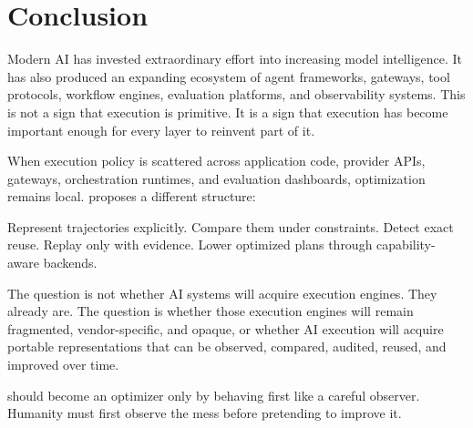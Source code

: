 \section{Conclusion}

Modern AI has invested extraordinary effort into increasing model intelligence. It has also produced an expanding ecosystem of agent frameworks, gateways, tool protocols, workflow engines, evaluation platforms, and observability systems. This is not a sign that execution is primitive. It is a sign that execution has become important enough for every layer to reinvent part of it.

When execution policy is scattered across application code, provider APIs, gateways, orchestration runtimes, and evaluation dashboards, optimization remains local. \migaki{} proposes a different structure:

\begin{center}
Represent trajectories explicitly. Compare them under constraints. Detect exact reuse. Replay only with evidence. Lower optimized plans through capability-aware backends.
\end{center}

The question is not whether AI systems will acquire execution engines. They already are. The question is whether those execution engines will remain fragmented, vendor-specific, and opaque, or whether AI execution will acquire portable representations that can be observed, compared, audited, reused, and improved over time.

\migaki{} should become an optimizer only by behaving first like a careful observer. Humanity must first observe the mess before pretending to improve it.
